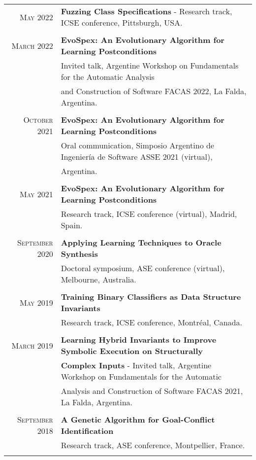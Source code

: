 \documentclass[a4paper,10pt]{article} %
\begin{document}
\begin{longtable}{rl}
\textsc{May} 2022 & \textbf{Fuzzing Class Specifications} - Research track, ICSE conference, Pittsburgh, USA. \\ & \\

\textsc{March} 2022 & \textbf{EvoSpex: An Evolutionary Algorithm for Learning Postconditions} \\ 
& Invited talk, Argentine Workshop on Fundamentals for the Automatic Analysis \\ 
& and Construction of Software FACAS 2022, La Falda, Argentina. \\ & \\

\textsc{October} 2021 & \textbf{EvoSpex: An Evolutionary Algorithm for Learning Postconditions} \\ 
& Oral communication, Simposio Argentino de Ingeniería de Software ASSE 2021 (virtual), \\ 
& Argentina. \\ & \\

\textsc{May} 2021 & \textbf{EvoSpex: An Evolutionary Algorithm for Learning Postconditions} \\ 
& Research track, ICSE conference (virtual), Madrid, Spain. \\ & \\

\textsc{September} 2020 & \textbf{Applying Learning Techniques to Oracle Synthesis} \\ 
& Doctoral symposium, ASE conference (virtual), Melbourne, Australia. \\ & \\

\textsc{May} 2019 & \textbf{Training Binary Classifiers as Data Structure Invariants} \\ 
& Research track, ICSE conference, Montréal, Canada. \\ & \\

\textsc{March} 2019 & \textbf{Learning Hybrid Invariants to Improve Symbolic Execution on Structurally} \\ 
& \textbf{Complex Inputs} - Invited talk, Argentine Workshop on Fundamentals for the Automatic \\ 
& Analysis and Construction of Software FACAS 2021, La Falda, Argentina. \\ & \\

\textsc{September} 2018 & \textbf{A Genetic Algorithm for Goal-Conflict Identification} \\ 
& Research track, ASE conference, Montpellier, France. \\ & \\


\end{longtable}
\end{document}
